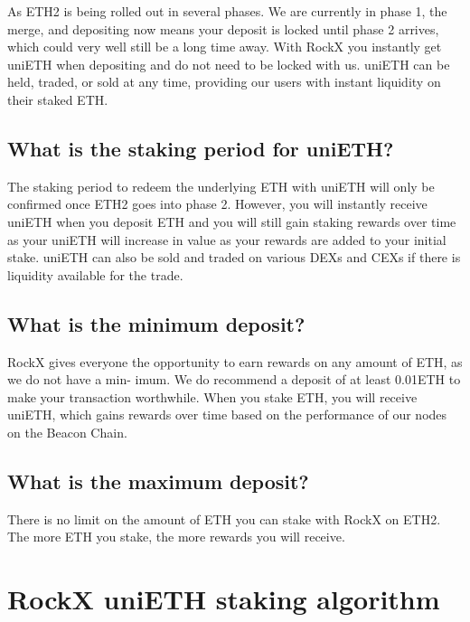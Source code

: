 \documentclass{article}
\begin{document}
As ETH2 is being rolled out in several phases. We are currently in phase 1, the merge, and depositing now means your deposit is locked until phase 2 arrives, which could very well still be a long time away. With RockX you instantly get uniETH when depositing and do not need to be locked with us. uniETH can be held, traded, or sold at any time, providing our users with instant liquidity on their staked ETH.

\subsection{What is the staking period for uniETH?}
The staking period to redeem the underlying ETH with uniETH will only be confirmed once ETH2 goes into phase 2. However, you will instantly receive uniETH when you deposit ETH and you will still gain staking rewards over time as your uniETH will increase in value as your rewards are added to your initial stake. uniETH can also be sold and traded on various DEXs and CEXs if there is liquidity available for the trade.

\subsection{What is the minimum deposit?}
RockX gives everyone the opportunity to earn rewards on any amount of ETH, as we do not have a min- imum. We do recommend a deposit of at least 0.01ETH to make your transaction worthwhile. When you stake ETH, you will receive uniETH, which gains rewards over time based on the performance of our nodes on the Beacon Chain.

\subsection{What is the maximum deposit?}   
There is no limit on the amount of ETH you can stake with RockX on ETH2. The more ETH you stake, the more rewards you will receive.

\section{RockX uniETH staking algorithm}
\end{document}
